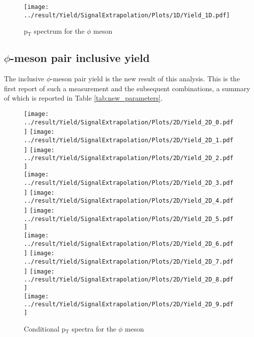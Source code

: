 \begin{figure}
	\centering
		\texttt{[image: ../result/Yield/SignalExtrapolation/Plots/1D/Yield\_1D.pdf]}
	\label{fig:spectrum1D}
	\caption{p$_{\text{T}}$ spectrum for the $\phi$ meson}
\end{figure}

\subsection{$\phi$-meson pair inclusive yield}
The inclusive $\phi$-meson pair yield is the new result of this analysis. This is the first report of such a measurement and the subsequent combinations, a summary of which is reported in Table \ref{tab:new_parameters}.

\begin{figure}[!h]
	\centering
		\texttt{[image: ../result/Yield/SignalExtrapolation/Plots/2D/Yield\_2D\_0.pdf]}
		\texttt{[image: ../result/Yield/SignalExtrapolation/Plots/2D/Yield\_2D\_1.pdf]}
		\texttt{[image: ../result/Yield/SignalExtrapolation/Plots/2D/Yield\_2D\_2.pdf]}\\
		\texttt{[image: ../result/Yield/SignalExtrapolation/Plots/2D/Yield\_2D\_3.pdf]}
		\texttt{[image: ../result/Yield/SignalExtrapolation/Plots/2D/Yield\_2D\_4.pdf]}
		\texttt{[image: ../result/Yield/SignalExtrapolation/Plots/2D/Yield\_2D\_5.pdf]}\\
		\texttt{[image: ../result/Yield/SignalExtrapolation/Plots/2D/Yield\_2D\_6.pdf]}
		\texttt{[image: ../result/Yield/SignalExtrapolation/Plots/2D/Yield\_2D\_7.pdf]}
		\texttt{[image: ../result/Yield/SignalExtrapolation/Plots/2D/Yield\_2D\_8.pdf]}\\
		\texttt{[image: ../result/Yield/SignalExtrapolation/Plots/2D/Yield\_2D\_9.pdf]}
	\label{fig:spectrum2D}
	\caption{Conditional p$_{\text{T}}$ spectra for the $\phi$ meson}
\end{figure}


